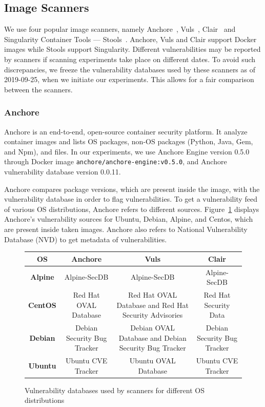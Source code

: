 \documentclass[a4paper,num-refs]{oup-contemporary}
\begin{document}
\subsection{Image Scanners}

We use four popular image scanners, namely Anchore~\cite{github_2019},
Vuls~\cite{future-architect_2019}, Clair~\cite{arminc_2019} and
Singularity Container Tools --- Stools~\cite{stools}. Anchore, Vuls and Clair support Docker
images while Stools support Singularity. Different vulnerabilities may be
reported by scanners if scanning experiments take place on different dates.
To avoid such discrepancies, we freeze the vulnerability
databases used by these scanners as of 2019-09-25, when we initiate our
experiments. This allows for a fair comparison between the scanners.

\subsubsection{Anchore}

Anchore is an end-to-end, open-source container security platform. It
analyze	container images and lists OS
packages, non-OS packages (Python, Java, Gem, and Npm), and files.
In our experiments, we use Anchore Engine version 0.5.0 through Docker image \texttt{anchore/anchore-engine:v0.5.0}, and
Anchore vulnerability database version 0.0.11.

Anchore compares package versions, which are present inside the
image, with the vulnerability database in order to flag vulnerabilities.
To get a vulnerability feed of various OS distributions, Anchore refers to
different sources. Figure~\ref{database} displays Anchore's vulnerability sources for
Ubuntu, Debian, Alpine, and Centos, which are present inside taken images.
Anchore also refers to National
Vulnerability Database (NVD) to get metadata of vulnerabilities.

\begin{figure}
\begin{tabular}{|c|c|c|c|}
 \hline
\textbf{OS} &	\textbf{Anchore} &	\textbf{Vuls} &	\textbf{Clair} \\
\hline
	\textbf{Alpine} & Alpine-SecDB &	Alpine-SecDB &	Alpine-SecDB \\
\hline
	\textbf{CentOS} & Red Hat OVAL Database & Red Hat OVAL Database and Red Hat Security Advisories & Red Hat Security Data \\
\hline
	\textbf{Debian} & Debian Security Bug Tracker &	Debian OVAL Database and Debian Security Bug Tracker & Debian Security Bug Tracker \\
\hline
	\textbf{Ubuntu} & Ubuntu CVE Tracker &	Ubuntu OVAL Database &	Ubuntu CVE Tracker \\
 \hline
\end{tabular}
\caption{Vulnerability databases used by scanners for different OS distributions}
\label{database}
\end{figure}
\end{document}
